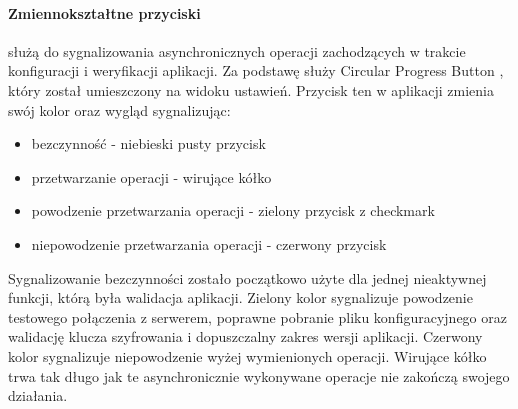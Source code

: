 \documentclass[eng]{mgr}
\begin{document}
				\paragraph{Zmiennokształtne przyciski}
				służą do sygnalizowania asynchronicznych operacji zachodzących w trakcie konfiguracji i weryfikacji aplikacji. Za podstawę służy Circular Progress Button \cite{circularprogressbutton}, który został umieszczony na widoku ustawień. Przycisk ten w aplikacji zmienia swój kolor oraz wygląd sygnalizując:
				\begin{itemize}
					\item bezczynność - niebieski pusty przycisk
					\item przetwarzanie operacji - wirujące kółko
					\item powodzenie przetwarzania operacji - zielony przycisk z checkmark
					\item niepowodzenie przetwarzania operacji - czerwony przycisk 
				\end{itemize}
				Sygnalizowanie bezczynności zostało początkowo użyte dla jednej nieaktywnej funkcji, którą była walidacja aplikacji. Zielony kolor sygnalizuje powodzenie testowego połączenia z serwerem, poprawne pobranie pliku konfiguracyjnego oraz walidację klucza szyfrowania i dopuszczalny zakres wersji aplikacji.
				Czerwony kolor sygnalizuje niepowodzenie wyżej wymienionych operacji.
				Wirujące kółko trwa tak długo jak te asynchronicznie wykonywane operacje nie zakończą swojego działania.\\
				
\end{document}
